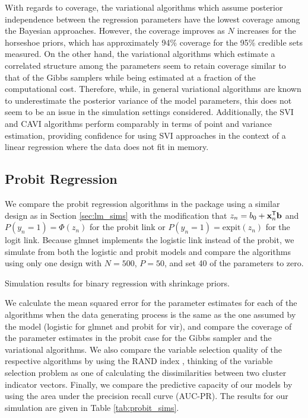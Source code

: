 \documentclass[]{article}
\newcommand{\Tra}{^{\sf T}} %
\def\b{{\bf b}}
\def\x{{\bf x}}
\newcommand{\pkg}[1]{{\fontseries{b}\selectfont #1}}
\begin{document}
With regards to coverage, the variational algorithms which assume posterior
independence between the regression parameters have the lowest coverage among
the Bayesian approaches. However, the coverage improves as $N$ increases for the
horseshoe priors, which has approximately 94\% coverage for the 95\% credible
sets measured. On the other hand, the variational algorithms which estimate a
correlated structure among the parameters seem to retain coverage similar to
that of the Gibbs samplers while being estimated at a fraction of the
computational cost.  Therefore, while, in general variational algorithms are
known to underestimate the posterior variance of the model parameters, this does
not seem to be an issue in the simulation settings considered. Additionally, the
SVI and CAVI algorithms perform comparably in terms of point and variance
estimation, providing confidence for using SVI approaches in the context of a
linear regression where the data does not fit in memory. 

\subsection{Probit Regression} \label{sec:probit_sims}

We compare the probit regression algorithms in the package using a similar
design as in Section \ref{sec:lm_sims} with the modification that $z_n  = b_0 +
\x_n\Tra \b$ and $P(y_n = 1) = \Phi(z_n)$ for the probit link or $P(y_n = 1) =
\text{expit}(z_n)$ for the logit link. Because \pkg{glmnet} implements the
logistic link instead of the probit, we simulate from both the logistic and
probit models and compare the algorithms using only one design with $N = 500$,
$P = 50$, and set 40 of the parameters to zero.

\begin{table}[t]
	\caption{Simulation results for binary regression with shrinkage priors.}	
	\label{tab:probit_sims}
	
\end{table}

We calculate the mean squared error for the parameter estimates for each of the
algorithms when the data generating process is the same as the one assumed by
the model (logistic for \pkg{glmnet} and probit for \pkg{vir}), and compare the
coverage of the parameter estimates in the probit case for the Gibbs sampler and
the variational algorithms. We also compare the variable selection quality of
the respective algorithms by using the RAND index \cite{rand1971objective},
thinking of the variable selection problem as one of calculating the
dissimilarities between two cluster indicator vectors. Finally, we compare the
predictive capacity of our models by using the area under the precision recall
curve (AUC-PR). The results for our simulation are given in Table
\ref{tab:probit_sims}. 
\end{document}
